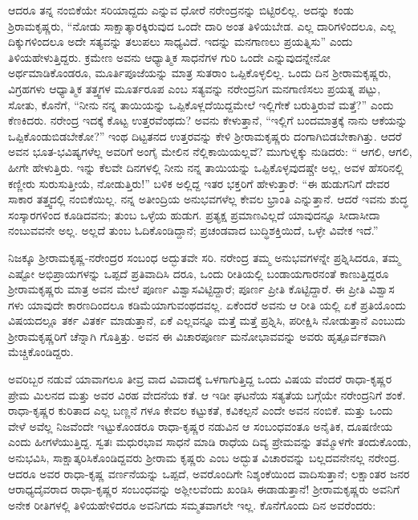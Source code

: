 ಆದರೂ ತನ್ನ ನಂಬಿಕೆಯೇ ಸರಿಯಾದ್ದದು ಎನ್ನುವ ಧೋರೆ ನರೇಂದ್ರನನ್ನು ಬಿಟ್ಟಿರಲಿಲ್ಲ. ಅದನ್ನು ಕಂಡು ಶ್ರಿರಾಮಕೃಷ್ಣರು, “ನೋಡು ಸಾಕ್ಷಾತ್ಕಾರಕ್ಕಿರುವುದ ಒಂದೇ ದಾರಿ ಅಂತ ತಿಳಿಯಬೇಡ. ಎಲ್ಲ ದಾರಿಗಳಿಂದಲೂ, ಎಲ್ಲ ದಿಕ್ಕುಗಳಿಂದಲೂ ಅದೇ ಸತ್ಯವನ್ನು ತಲುಪಲು ಸಾಧ್ಯವಿದೆ. ಇದನ್ನು ಮನಗಾಣಲು ಪ್ರಯತ್ನಿಸು” ಎಂದು ತಿಳಿಯಹೇಳುತ್ತಿದ್ದರು. ಕ್ರಮೇಣ ಅವನು ಆಧ್ಯಾತ್ಮಿಕ ಸಾಧನೆಗಳ ಗುರಿ ಒಂದೇ ಎನ್ನುವುದನ್ನೇನೋ ಅರ್ಥಮಾಡಿಕೊಂಡರೂ, ಮೂರ್ತಿಪೂಜೆಯನ್ನು ಮಾತ್ರ ಸುತರಾಂ ಒಪ್ಪಿಕೊಳ್ಳಲಿಲ್ಲ. ಒಂದು ದಿನ ಶ್ರೀರಾಮಕೃಷ್ಣರು, ವಿಗ್ರಹಗಳು ಆಧ್ಯಾತ್ಮಿಕ ತತ್ತ್ವಗಳ ಮೂರ್ತರೂಪ ಎಂಬ ಸತ್ಯವನ್ನು ನರೇಂದ್ರನಿಗ ಮನಗಾಣಿಸಲು ಪ್ರಯತ್ನ ಪಟ್ಟು, ಸೋತು, ಕೊನೆಗೆ, “ನೀನು ನನ್ನ ತಾಯಿಯನ್ನು ಒಪ್ಪಿಕೊಳ್ಲದೆಯಿದ್ದಮೇಲೆ ಇಲ್ಲಿಗೇಕೆ ಬರುತ್ತಿರುವೆ ಮತ್ತೆ?” ಎಂದು ಕೆಣಕಿದರು. ನರೇಂದ್ರ ಇದಕ್ಕೆ ಕೊಟ್ಟ ಉತ್ತರವೆಂಥದು? ಅವನು ಕೇಳುತ್ತಾನೆ, “ಇಲ್ಲಿಗೆ ಬಂದಮಾತ್ರಕ್ಕೆ ನಾನು ಆಕೆಯನ್ನು ಒಪ್ಪಿಕೊಂಡುಬಿಡಬೇಕೋ?” ಇಂಥ ದಿಟ್ಟತನದ ಉತ್ತರವನ್ನು ಕೇಳಿ ಶ್ರೀರಾಮಕೃಷ್ಣರು ದಂಗಾಗಿಬಿಡಬೇಕಾಗಿತ್ತು. ಆದರೆ ಅವನ ಭೂತ-ಭವಿಷ್ಯಗಳೆಲ್ಲ ಅವರಿಗೆ ಅಂಗೈ ಮೇಲಿನ ನೆಲ್ಲಿಕಾಯಿಯಲ್ಲವೆ? ಮುಗುಳ್ನಕ್ಕು ನುಡಿದರು: “ ಆಗಲಿ, ಆಗಲಿ, ಹೀಗೇ ಹೇಳುತ್ತಿರು. ಇನ್ನು ಕೆಲವೇ ದಿನಗಳಲ್ಲಿ ನೀನು ನನ್ನ ತಾಯಿಯನ್ನು ಒಪ್ಪಿಕೊಳ್ಳವುದಷ್ಚೇ ಅಲ್ಲ, ಅವಳ ಹೆಸರಿನಲ್ಲಿ ಕಣ್ಣೀರು ಸುರುಸುತ್ತೀಯೆ, ನೋಡುತ್ತಿರು!” ಬಳಿಕ ಅಲ್ಲಿದ್ದ ಇತರ ಭಕ್ತರಿಗೆ ಹೇಳುತ್ತಾರೆ: “ಈ ಹುಡುಗನಿಗೆ ದೇವರ ಸಾಕಾರ ತತ್ತ್ವದಲ್ಲಿ ನಂಬಿಕೆಯಿಲ್ಲ. ನನ್ನ ಅತೀಂದ್ರಿಯ ಅನುಭವಗಳೆಲ್ಲ ಕೇವಲ ಭ್ರಾಂತಿ ಎನ್ನುತ್ತಾನೆ. ಆದರೆ ಇವನು ಶುದ್ಧ ಸಂಸ್ಕಾರಗಳಿಂದ ಕೂಡಿದವನು; ತುಂಬ ಒಳ್ಳೆಯ ಹುಡುಗ. ಪ್ರತ್ಯಕ್ಷ ಪ್ರಮಾಣವಿಲ್ಲದೆ ಯಾವುದನ್ನೂ ಸೀದಾಸೀದಾ ನಂಬುವವನೇ ಅಲ್ಲ. ಅಲ್ಲದೆ ತುಂಬ ಓದಿಕೊಂಡಿದ್ದಾನೆ; ಪ್ರಚಂಡವಾದ ಬುದ್ಧಿಶಕ್ತಿಯಿದೆ, ಒಳ್ಳೇ ವಿವೇಕ ಇದೆ.”

ನಿಜಕ್ಕೂ ಶ್ರೀರಾಮಕೃಷ್ಣ-ನರೇಂದ್ರರ ಸಂಬಂಧ ಅದ್ಭುತವೇ ಸರಿ. ನರೇಂದ್ರ ತಮ್ಮ ಅನುಭವಗಳನ್ನೇ ಪ್ರಶ್ನಿಸಿದರೂ, ತಮ್ಮ ಎಷ್ಟೋ ಅಭಿಪ್ರಾಯಗಳನ್ನು ಒಪ್ಪದೆ ಪ್ರತಿವಾದಿಸಿ ದರೂ, ಒಂದು ರೀತಿಯಲ್ಲಿ ಬಂಡಾಯಗಾರನಂತೆ ಕಾಣುತ್ತಿದ್ದರೂ ಶ್ರೀರಾಮಕೃಷ್ಣರು ಮಾತ್ರ ಅವನ ಮೇಲೆ ಪೂರ್ಣ ವಿಶ್ವಾಸವಿಟ್ಟಿದ್ದಾರೆ; ಪೂರ್ಣ ಪ್ರೀತಿ ಕೊಟ್ಟಿದ್ದಾರೆ. ಈ ಪ್ರೀತಿ ವಿಶ್ವಾಸ ಗಳು ಯಾವುದೇ ಕಾರಣದಿಂದಲೂ ಕಡಿಮೆಯಾಗುವಂಥದವಲ್ಲ. ಏಕೆಂದರೆ ಅವನು ಆ ರೀತಿ ಯಲ್ಲಿ ಏಕೆ ಪ್ರತಿಯೊಂದು ವಿಷಯದಲ್ಲೂ ತರ್ಕ ವಿತರ್ಕ ಮಾಡುತ್ತಾನೆ, ಏಕೆ ಎಲ್ಲವನ್ನೂ ಮತ್ತೆ ಮತ್ತೆ ಪ್ರಶ್ನಿಸಿ, ಪರೀಕ್ಷಿಸಿ ನೋಡುತ್ತಾನೆ ಎಂಬುದು ಶ್ರೀರಾಮಕೃಷ್ಣರಿಗೆ ಚೆನ್ನಾಗಿ ಗೊತ್ತಿತ್ತು. ಅವನ ಈ ವಿಚಾರಪೂರ್ಣ ಮನೋಭಾವವನ್ನು ಅವರು ಹೃತ್ಪೂರ್ವಕವಾಗಿ ಮೆಚ್ಚಿಕೊಂಡಿದ್ದರು.

ಅವರಿಬ್ಬರ ನಡುವೆ ಯಾವಾಗಲೂ ತೀವ್ರ ವಾದ ವಿವಾದಕ್ಕೆ ಒಳಗಾಗುತ್ತಿದ್ದ ಒಂದು ವಿಷಯ ವೆಂದರೆ ರಾಧಾ-ಕೃಷ್ಣರ ಪ್ರೇಮ ಮಿಲನದ ಮತ್ತು ಅವರ ವಿರಹ ವೇದನೆಯ ಕತೆ. ಆ ಇಡೀ ಘಟನೆಯ ಸತ್ಯತೆಯ ಬಗ್ಗೆಯೇ ನರೇಂದ್ರನಿಗೆ ಶಂಕೆ. ರಾಧಾ-ಕೃಷ್ಣರ ಕುರಿತಾದ ಎಲ್ಲ ಬಣ್ಣನೆ ಗಳೂ ಕೇವಲ ಕಟ್ಟುಕತೆ, ಕವಿಕಲ್ಪನೆ ಎಂದೇ ಅವನ ನಂಬಿಕೆ. ಮತ್ತು ಒಂದು ವೇಳೆ ಅವೆಲ್ಲ ನಿಜವೆಂದೇ ಇಟ್ಟುಕೊಂಡರೂ ರಾಧಾ-ಕೃಷ್ಣರ ನಡುವಿನ ಆ ಸಂಬಂಧವಂತೂ ಅನೈತಿಕ, ದೂಷಣೀಯ ಎಂದು ಹೀಗಳೆಯುತ್ತಿದ್ದ. ಸ್ವತಃ ಮಧುರಭಾವ ಸಾಧನೆ ಮಾಡಿ ರಾಧೆಯ ದಿವ್ಯ ಪ್ರೇಮವನ್ನು ತಮ್ಮೊಳಗೇ ತಂದುಕೊಂಡು, ಅನುಭವಿಸಿ, ಸಾಕ್ಷಾತ್ಕರಿಸಿಕೊಂಡಿದ್ದವರು ಶ್ರೀರಾಮ ಕೃಷ್ಣರು ಎಂಬ ಅದ್ಭುತ ವಿಚಾರವನ್ನು ಬಲ್ಲದವನೇನಲ್ಲ ನರೇಂದ್ರ. ಆದರೂ ಅವರ ರಾಧಾ-ಕೃಷ್ಣ ವರ್ಣನೆಯನ್ನು ಒಪ್ಪದೆ, ಅವರೊಂದಿಗೇ ನಿಶ್ಶಂಕೆಯಿಂದ ವಾದಿಸುತ್ತಾನೆ; ಲಕ್ಷಾಂತರ ಜನರ ಆರಾಧ್ಯದೈವರಾದ ರಾಧಾ-ಕೃಷ್ಣರ ಸಂಬಂಧವನ್ನು ಅಶ್ಲೀಲವೆಂದು ಖಂಡಿಸಿ ಈಡಾಡುತ್ತಾನೆ! ಶ್ರೀರಾಮಕೃಷ್ಣರು ಅವನಿಗೆ ಅನೇಕ ರೀತಿಗಳಲ್ಲಿ ತಿಳಿಯಹೇಳಿದರೂ ಅವನಿಗದು ಸಮ್ಮತವಾಗಲೇ ಇಲ್ಲ. ಕೊನೆಗೊಂದು ದಿನ ಅವರೆಂದರು:

